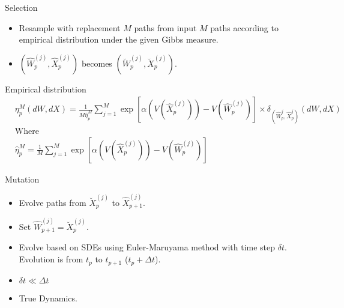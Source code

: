 \begin{frame}{Selection}
	\begin{itemize}
		\item Resample with replacement $M$ paths from input $M$ paths according
		      to empirical distribution under the given Gibbs measure.
		\item $\left( \hat{W}_p^{(j)}, \hat{X}_p^{(j)} \right)$ becomes $\left( \breve{W}_p^{(j)}, \breve{X}_p^{(j)}\right)$.
	\end{itemize}
	\begin{block}{Empirical distribution}
		\begin{equation*}
			\begin{split}
				&\eta_{p}^{M}(dW,dX) = \frac{1}{M \hat{\eta}_{p}^{M}}\sum_{j=1}^{M}\exp\left[{\alpha(V(\hat{X}_{p}^{(j)}))-V(\hat{W}^{(j)}_{p})}\right] \times \delta_{(\hat{W}_p^{j},\hat{X}_p^{j})}(dW,dX) \\
				&\text{Where}\\
				&\hat{\eta}_{p}^{M} =
				\frac{1}{M}\sum_{j=1}^{M}\exp\left[{\alpha(V(\hat{X}_{p}^{(j)}))-V(\hat{W}^{(j)}_{p})}\right]
			\end{split}
		\end{equation*}
	\end{block}
\end{frame}

\begin{frame}{Mutation}
	\begin{itemize}
		\item Evolve paths from $\breve{X}_p^{(j)}$ to $\hat{X}_{p+1}^{(j)}$.
		\item Set $\hat{W}_{p+1}^{(j)} = \breve{X}_p^{(j)}$.
		\item Evolve based on SDEs using Euler-Maruyama method with time step
		      $\delta t$. Evolution is from $t_p$ to $t_{p+1}$ ($t_p + \Delta t$).
		\item $\delta t \ll \Delta t$
		\item True Dynamics.
	\end{itemize}
\end{frame}


